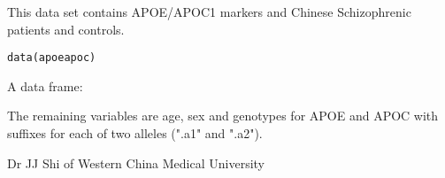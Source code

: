 \documentclass[a4paper]{book}
\begin{document}
\begin{Description}\relax
This data set contains APOE/APOC1 markers 
and Chinese Schizophrenic patients and controls.\end{Description}
\begin{Usage}
\begin{verbatim}data(apoeapoc)\end{verbatim}
\end{Usage}
\begin{Format}\relax
A data frame:

The remaining variables are age, sex and genotypes for APOE and APOC 
with suffixes for each of two alleles (".a1" and ".a2").\end{Format}
\begin{Source}\relax
Dr JJ Shi of Western China Medical University\end{Source}
\end{document}
